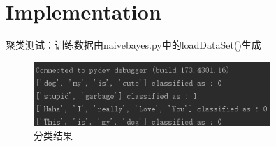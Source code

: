 \documentclass{ctexart}
\begin{document}
\section{Implementation}
聚类测试：训练数据由naivebayes.py中的loadDataSet()生成
\begin{figure}[H]
\begin{center}
\includegraphics[width=0.8\textwidth]{fig/result.png} %
\caption{分类结果}
\end{center}
\end{figure}
\end{document}
